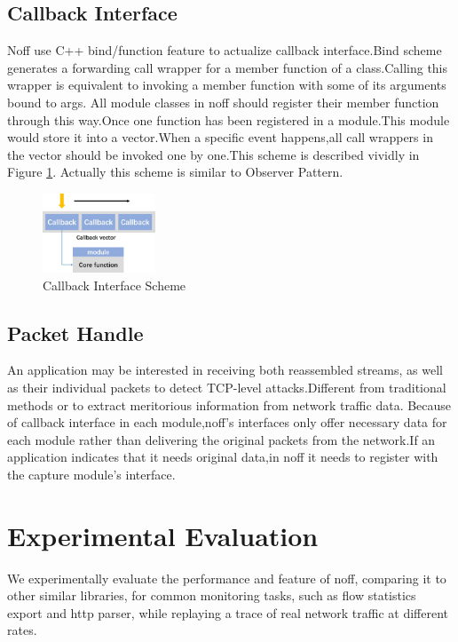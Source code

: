 \documentclass[conference]{IEEEtran}
\begin{document}
\subsection{Callback Interface}
Noff use C++ bind/function feature to actualize callback interface.Bind scheme generates a forwarding call wrapper for a member function of a class.Calling this wrapper is equivalent to invoking a member function with some of its arguments bound to args. 
All module classes in noff should register their member function through this way.Once one function has been registered in a module.This module would store it into a vector.When a specific event happens,all call wrappers in the vector should be invoked one by one.This scheme is described vividly in Figure \ref{fig:6}.
\newline\indent Actually this scheme is similar to Observer Pattern.
\begin{figure}[htbp]
  \centering
  \includegraphics[width=0.3\textwidth]{./picture/Figure5.jpg}
  \caption{Callback Interface Scheme}
  \label{fig:6}
\end{figure}
\subsection{Packet Handle}
An application may be interested in receiving both reassembled streams, as well as their individual packets to detect TCP-level attacks.Different from traditional methods or to extract meritorious information from network traffic data. Because of callback interface in each module,noff's interfaces only offer necessary data for each module rather than delivering the original packets from the network.If an application indicates that it needs original data,in noff it needs to register with the capture module's interface.

\section{Experimental Evaluation}
We experimentally evaluate the performance and feature of noff, comparing it to other similar libraries, for common monitoring tasks, such as flow statistics export and http parser, while replaying a trace of real network traffic at different rates.
\end{document}

